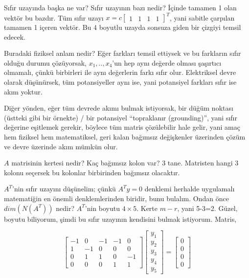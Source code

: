 \documentclass[12pt,fleqn]{article}\usepackage{../../common}
\begin{document}
Sıfır uzayında başka ne var? Sıfır uzayının bazı nedir? İçinde tamamen 1
olan vektör bu bazdır. Tüm sıfır uzayı $x = c \left[\begin{array}{cccc} 1 &
1 & 1 & 1 \end{array}\right]^T$, yani sabitle 
çarpılan tamamen 1 içeren vektör. Bu 4 boyutlu uzayda sonsuza giden bir
çizgiyi temsil edecek. 

Buradaki fiziksel anlam nedir? Eğer farkları temsil ettiysek ve bu
farkların sıfır olduğu durumu çözüyorsak, $x_1,..,x_4$'un hep aynı değerde
olması şaşırtıcı olmamalı, çünkü birbirleri ile aynı değerlerin farkı sıfır
olur. Elektriksel devre olarak düşünürsek, tüm potansiyeller aynı ise, yani
potansiyel farkları sıfır ise akım yoktur. 

Diğer yönden, eğer tüm devrede akımı bulmak istiyorsak, bir düğüm noktası
(üstteki gibi bir örnekte) / bir potansiyel ``topraklanır (grounding)'',
yani sıfır değerine eşitlemek gerekir, böylece tüm matris çözülebilir hale
gelir, yani amaç hem fiziksel hem matematiksel, geri kalan bağımsız
değişkenler üzerinden çözüm ve devre üzerinde akım mümkün olur.

$A$ matrisinin kertesi nedir? Kaç bağımsız kolon var? 3 tane. Matristen
hangi 3 kolonu seçersek bu kolonlar birbirinden bağımsız olacaktır. 

$A^T$'nin sıfır uzayını düşünelim; çünkü $A^Ty=0$ denklemi herhalde
uygulamalı matematiğin en önemli denklemlerinden biridir, bunu
bulalım. Ondan önce $dim(N(A^T))$ nedir? $A^T$'nin boyutu $4 \times
5$. Kerte $m-r$, yani 5-3=2. Güzel, boyutu biliyorum, şimdi bu sıfır
uzayının kendisini bulmak istiyorum. Matris,

$$ 
\left[\begin{array}{rrrrr}
-1 & 0 & -1 & -1 & 0 \\
1 & -1 & 0 & 0 & 0 \\
0 & 1 & 1 & 0 & -1 \\
0 & 0 & 0 & 1 & 1
\end{array}\right]
\left[\begin{array}{r}
y_1 \\ y_2 \\ y_3 \\ y_4 \\ y_5
\end{array}\right]
=
\left[\begin{array}{r}
0 \\ 0 \\ 0 \\ 0 
\end{array}\right]
 $$
\end{document}
